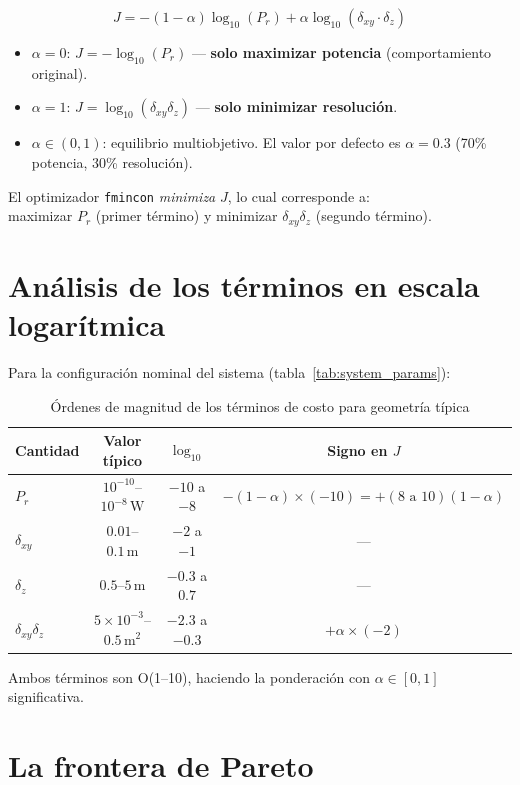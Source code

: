 \documentclass[12pt,a4paper,oneside]{book}
\newcommand{\result}[2]{%
  \begin{tcolorbox}[enhanced, breakable,
    colback=yellow!8, colframe=orange!70!black,
    fonttitle=\bfseries,
    title={\protect#1},
    attach boxed title to top left={yshift=-2mm, xshift=5mm},
    boxed title style={colback=orange!70!black}]
    #2
  \end{tcolorbox}}
\newcommand{\Prcv}{P_r}
\newcommand{\alphaR}{\alpha}
\newcommand{\dxy}{\delta_{xy}}
\newcommand{\dz}{\delta_z}
\begin{document}
\result{Función de Costo Multi-Objetivo Log-Normalizada}{
\[
\boxed{J = -(1-\alphaR)\log_{10}(\Prcv) + \alphaR\log_{10}(\dxy\cdot\dz)}
\]
\begin{itemize}
  \item $\alphaR = 0$: $J = -\log_{10}(\Prcv)$ — \textbf{solo maximizar potencia} (comportamiento original).
  \item $\alphaR = 1$: $J = \log_{10}(\dxy\dz)$ — \textbf{solo minimizar resolución}.
  \item $\alphaR \in (0,1)$: equilibrio multiobjetivo. El valor por defecto es $\alphaR = 0.3$ (70\% potencia, 30\% resolución).
\end{itemize}
El optimizador \texttt{fmincon} \emph{minimiza} $J$, lo cual corresponde a:\\
maximizar $\Prcv$ (primer término) y minimizar $\dxy\dz$ (segundo término).
}

\section{Análisis de los términos en escala logarítmica}

Para la configuración nominal del sistema (tabla~\ref{tab:system_params}):

\begin{table}[H]
\centering
\caption{Órdenes de magnitud de los términos de costo para geometría típica}
\label{tab:cost_magnitudes}
\begin{tabular}{lccc}
\toprule
Cantidad & Valor típico & $\log_{10}$ & Signo en $J$ \\
\midrule
$\Prcv$ & $10^{-10}$–$10^{-8}\,\text{W}$ & $-10$ a $-8$ & $-(1-\alphaR)\times(-10)=+(8\text{ a }10)(1-\alphaR)$ \\
$\dxy$ & $0.01$–$0.1\,\text{m}$ & $-2$ a $-1$ & — \\
$\dz$ & $0.5$–$5\,\text{m}$ & $-0.3$ a $0.7$ & — \\
$\dxy\dz$ & $5\times10^{-3}$–$0.5\,\text{m}^2$ & $-2.3$ a $-0.3$ & $+\alphaR\times(-2)$ \\
\bottomrule
\end{tabular}
\end{table}

Ambos términos son O(1--10), haciendo la ponderación con $\alphaR\in[0,1]$ significativa.

\section{La frontera de Pareto}
\end{document}
